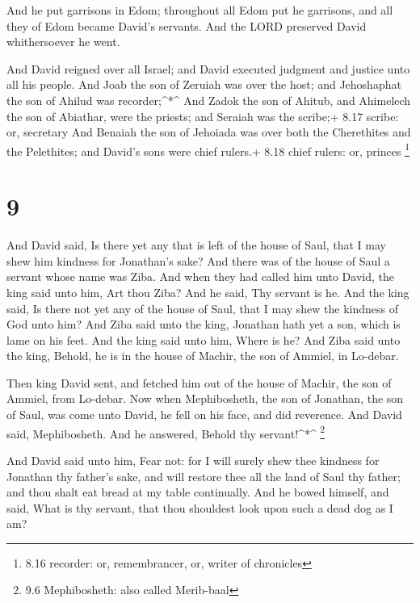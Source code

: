  And he put garrisons in Edom; throughout all Edom put he
garrisons, and all they of Edom became David's servants. And the LORD
preserved David whithersoever he went.

 And David reigned over all Israel; and David executed
judgment and justice unto all his people.  And Joab the son
of Zeruiah was over the host; and Jehoshaphat the son of Ahilud was
recorder;\^{}*\^{}  And Zadok the son of Ahitub, and
Ahimelech the son of Abiathar, were the priests; and Seraiah was the
scribe;+ 8.17 scribe: or, secretary  And Benaiah the son of
Jehoiada was over both the Cherethites and the Pelethites; and David's
sons were chief rulers.+ 8.18 chief rulers: or, princes \footnote{8.16
  recorder: or, remembrancer, or, writer of chronicles}

\hypertarget{section-8}{%
\section{9}\label{section-8}}

 And David said, Is there yet any that is left of the house
of Saul, that I may shew him kindness for Jonathan's sake? 
And there was of the house of Saul a servant whose name was Ziba. And
when they had called him unto David, the king said unto him, Art thou
Ziba? And he said, Thy servant is he.  And the king said, Is
there not yet any of the house of Saul, that I may shew the kindness of
God unto him? And Ziba said unto the king, Jonathan hath yet a son,
which is lame on his feet.  And the king said unto him,
Where is he? And Ziba said unto the king, Behold, he is in the house of
Machir, the son of Ammiel, in Lo-debar.

 Then king David sent, and fetched him out of the house of
Machir, the son of Ammiel, from Lo-debar.  Now when
Mephibosheth, the son of Jonathan, the son of Saul, was come unto David,
he fell on his face, and did reverence. And David said, Mephibosheth.
And he answered, Behold thy servant!\^{}*\^{} \footnote{9.6
  Mephibosheth: also called Merib-baal}

 And David said unto him, Fear not: for I will surely shew
thee kindness for Jonathan thy father's sake, and will restore thee all
the land of Saul thy father; and thou shalt eat bread at my table
continually.  And he bowed himself, and said, What is thy
servant, that thou shouldest look upon such a dead dog as I am?

